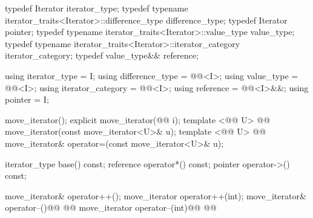 %
\begin{codeblock}
namespace std { @@
  template <@@>
    @@
  class move_iterator {
  public:
\end{codeblock}\begin{removedblock}\begin{codeblock}
    typedef Iterator                                              iterator_type;
    typedef typename iterator_traits<Iterator>::difference_type   difference_type;
    typedef Iterator                                              pointer;
    typedef typename iterator_traits<Iterator>::value_type        value_type;
    typedef typename iterator_traits<Iterator>::iterator_category iterator_category;
    typedef value_type&&                                          reference;
\end{codeblock}\end{removedblock}\begin{addedblock}\begin{codeblock}
    using iterator_type = I;
    using difference_type = @@<I>;
    using value_type = @@<I>;
    using iterator_category = @@<I>;
    using reference = @@<I>&&;
    using pointer = I;
\end{codeblock}\end{addedblock}\begin{codeblock}

    move_iterator();
    explicit move_iterator(@@ i);
    template <@@ U>
      @@
    move_iterator(const move_iterator<U>& u);
    template <@@ U>
      @@
    move_iterator& operator=(const move_iterator<U>& u);

    iterator_type base() const;
    reference operator*() const;
    pointer operator->() const;

    move_iterator& operator++();
    move_iterator operator++(int);
    move_iterator& operator--()@\removed{;}@
      @@
    move_iterator operator--(int)@\removed{;}@
      @@


\end{codeblock}
